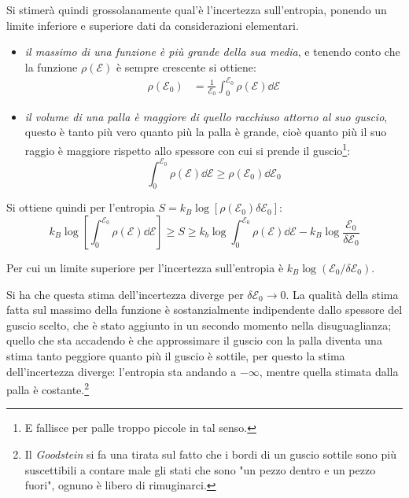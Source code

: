 Si stimerà quindi grossolanamente qual'è l'incertezza sull'entropia, ponendo un limite inferiore e superiore dati da considerazioni elementari.
\begin{itemize}
	\item \textit{il massimo di una funzione è più grande della sua media}, e tenendo conto che la funzione $\rho(\mathcal{E})$ è sempre crescente si ottiene:
	\begin{align*}
	\rho(\mathcal{E}_0) &= \frac{1}{\mathcal{E}_0} \int_{0}^{\mathcal{E}_0} \rho(\mathcal{E}) \dd \mathcal{E}
	\end{align*}
	\item \textit{il volume di una palla è maggiore di quello racchiuso attorno al suo guscio}, questo è tanto più vero quanto più la palla è grande, cioè quanto più il suo raggio è maggiore rispetto allo spessore con cui si prende il guscio\footnote{E fallisce per palle troppo piccole in tal senso.}:
	\begin{equation*}
	\int_{0}^{\mathcal{E}_0} \rho(\mathcal{E}) \dd \mathcal{E} \geq \rho(\mathcal{E}_0) \dd \mathcal{E}_0
	\end{equation*}	
\end{itemize}

\noindent Si ottiene quindi per l'entropia $S = k_B \log[\rho(\mathcal{E}_0) \delta \mathcal{E}_0]$:
\begin{equation*}
k_B \log \left[\int_{0}^{\mathcal{E}_0} \rho(\mathcal{E}) \dd \mathcal{E} \right] \geq S \geq k_b \log \int_{0}^{\mathcal{E}_0} \rho(\mathcal{E}) \dd \mathcal{E} - k_B \log \frac{\mathcal{E}_0}{\delta \mathcal{E}_0}
\end{equation*}

\noindent Per cui un limite superiore per l'incertezza sull'entropia è $k_B \log( \mathcal{E}_0/\delta \mathcal{E}_0)$.

Si ha che questa stima dell'incertezza diverge per $\delta \mathcal{E}_0 \rightarrow 0$.
La qualità della stima fatta sul massimo della funzione è sostanzialmente indipendente dallo spessore del guscio scelto, che è stato aggiunto in un secondo momento nella disuguaglianza; quello che sta accadendo è che approssimare il guscio con la palla diventa una stima tanto peggiore quanto più il guscio è sottile, per questo la stima dell'incertezza diverge: l'entropia sta andando a $-\infty$, mentre quella stimata dalla palla è costante.\footnote{Il \textit{Goodstein} si fa una tirata sul fatto che i bordi di un guscio sottile sono più suscettibili a contare male gli stati che sono "un pezzo dentro e un pezzo fuori", ognuno è libero di rimuginarci.}
\newline

